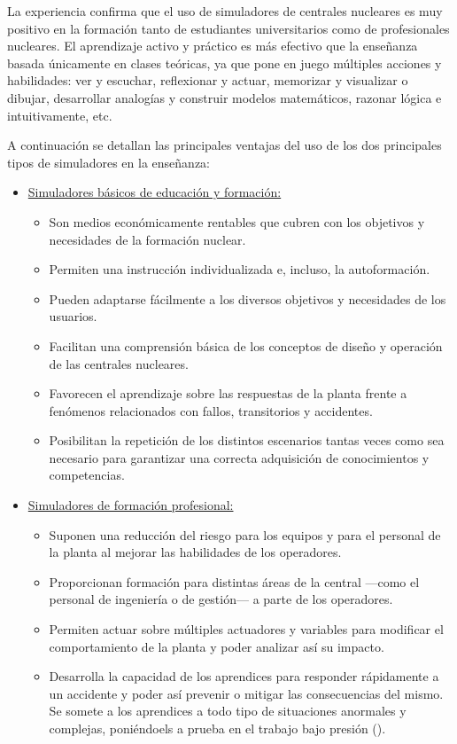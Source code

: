 La experiencia confirma que el uso de simuladores de centrales nucleares es muy positivo en la formación tanto de estudiantes universitarios como de profesionales nucleares. El aprendizaje activo y práctico es más efectivo que la enseñanza basada únicamente en clases teóricas, ya que pone en juego múltiples acciones y habilidades: ver y escuchar, reflexionar y actuar, memorizar y visualizar o dibujar, desarrollar analogías y construir modelos matemáticos, razonar lógica e intuitivamente, etc.

A continuación se detallan las principales ventajas del uso de los dos principales tipos de simuladores en la enseñanza:

\begin{itemize}
  \item \underline{Simuladores básicos de educación y formación:}
  \begin{itemize}
    \item Son medios económicamente rentables que cubren con los objetivos y necesidades de la formación nuclear.
    \item Permiten una instrucción individualizada e, incluso, la autoformación.
    \item Pueden adaptarse fácilmente a los diversos objetivos y necesidades de los usuarios.
    \item Facilitan una comprensión básica de los conceptos de diseño y operación de las centrales nucleares.
    \item Favorecen el aprendizaje sobre las respuestas de la planta frente a fenómenos relacionados con fallos, transitorios y accidentes.
    \item Posibilitan la repetición de los distintos escenarios tantas veces como sea necesario para garantizar una correcta adquisición de conocimientos y competencias.
  \end{itemize}
  \item \underline{Simuladores de formación profesional:}
  \begin{itemize}
    \item Suponen una reducción del riesgo para los equipos y para el personal de la planta al mejorar las habilidades de los operadores.
    \item Proporcionan formación para distintas áreas de la central ---como el personal de ingeniería o de gestión--- a parte de los operadores.
    \item Permiten actuar sobre múltiples actuadores y variables para modificar el comportamiento de la planta y poder analizar así su impacto.
    \item Desarrolla la capacidad de los aprendices para responder rápidamente a un accidente y poder así prevenir o mitigar las consecuencias del mismo. Se somete a los aprendices a todo tipo de situaciones anormales y complejas, poniéndoels a prueba en el trabajo bajo presión (\cite{international2019iaea}).
  \end{itemize} 
\end{itemize}

